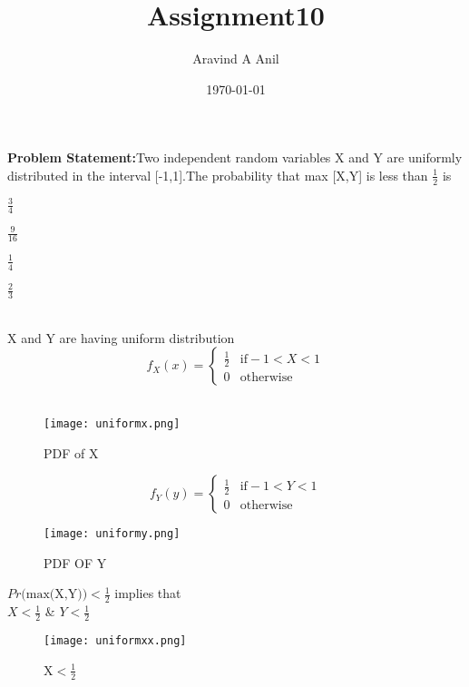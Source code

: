 \documentclass[11pt,a4paper,twocolumn]{article}
\title{Assignment10}
\author{Aravind A Anil}
\date{\today}
\begin{document}
\maketitle

\textbf{Problem Statement:}Two independent random variables X and Y
are uniformly distributed in the interval [-1,1].The probability that max [X,Y] is less than $\frac{1}{2}$ is\\[5pt]
\begin{enumerate*}[label=\alph*)]
    \item $\frac{3}{4}$\hspace{.5cm}
    \item $\frac{9}{16}$\hspace{.5cm}
    \item $\frac{1}{4}$\hspace{.5cm}
    \item $\frac{2}{3}$\hspace{.5cm}
\end{enumerate*}\\[5pt]
X and Y are having uniform distribution\\
\begin{equation*}
  f_{X}(x)=
\begin{cases}
\frac{1}{2} & \text{if} -1<X<1\\
0 & \text{otherwise}
\end{cases}
\end{equation*}\\
\begin{figure}[h!]
    \centering
    \texttt{[image: uniformx.png]}
    \caption{PDF of X}
    \label{fig:my_label}
\end{figure}
\begin{equation*}
     f_{Y}(y)=
     \begin{cases}
     \frac{1}{2} & \text{if} -1<Y<1\\
     0 & \text{otherwise}
     \end{cases}
\end{equation*}
\begin{figure}[h!]
    \centering
    \texttt{[image: uniformy.png]}
    \caption{PDF OF Y}
\end{figure}
\newpage
$Pr\Big(\text{max(X,Y)}\Big)<\frac{1}{2}$ implies that\\[5pt]
$X<\frac{1}{2}$ \& $Y<\frac{1}{2}$\\
\begin{figure}[h!]
    \centering
    \texttt{[image: uniformxx.png]}
    \caption{X$<\frac{1}{2}$}
\end{figure}
\end{document}
